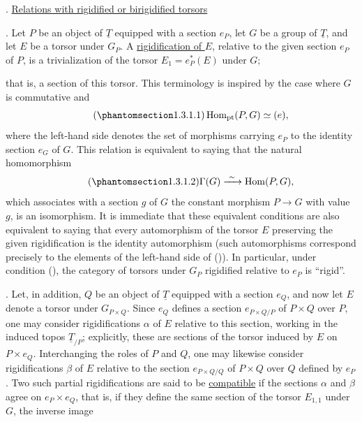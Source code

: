 
. \underline{Relations with rigidified or birigidified torsors}

. Let $P$ be an object of $\underline T$ equipped with a section
$e_P$, let $G$ be a group of $\underline T$, and let $E$ be a torsor
under $G_P$. A \underline{rigidification of $E$}, relative to the given
section $e_P$ of $P$, is a trivialization of the torsor
$E_1=e_P^*(E)$ under $G$;


that is, a section of this torsor. This terminology is inspired by the
case where $G$ is commutative and
\begin{equation}\tag{\SGARefTarget{sga7.sga7i.evii.n1-3-1-1}{1.3.1.1}}
 \operatorname{Hom}_{\mathrm{pt}}(P,G)\simeq(e),
\end{equation}
where the left-hand side denotes the set of morphisms carrying $e_P$ to
the identity section $e_G$ of $G$. This relation is equivalent to saying
that the natural homomorphism
\begin{equation}\tag{\SGARefTarget{sga7.sga7i.evii.n1-3-1-2}{1.3.1.2}}
 \Gamma(G)\xrightarrow{\ \sim\ }\operatorname{Hom}(P,G),
\end{equation}
which associates with a section $g$ of $G$ the constant morphism
$P\longrightarrow G$ with value $g$, is an isomorphism. It is immediate
that these equivalent conditions are also equivalent to saying that
every automorphism of the torsor $E$ preserving the given
rigidification is the identity automorphism (such automorphisms
correspond precisely to the elements of the left-hand side of
()). In particular, under condition (), the category of
torsors under $G_P$ rigidified relative to $e_P$ is ``rigid''.

. Let, in addition, $Q$ be an object of $\underline T$ equipped
with a section $e_Q$, and now let $E$ denote a torsor under
$G_{P\times Q}$. Since $e_Q$ defines a section
$e_{P\times Q/P}$ of $P\times Q$ over $P$, one may consider
rigidifications $\alpha$ of $E$ relative to this section, working in the
induced topos $\underline T_{/P}$; explicitly, these are sections of the
torsor induced by $E$ on $P\times e_Q$. Interchanging the roles of $P$
and $Q$, one may likewise consider rigidifications $\beta$ of $E$
relative to the section $e_{P\times Q/Q}$ of $P\times Q$ over $Q$
defined by $e_P$. Two such partial rigidifications are said to be
\underline{compatible} if the sections $\alpha$ and $\beta$ agree on
$e_P\times e_Q$, that is, if they define the same section of the torsor
$E_{1,1}$ under $G$, the inverse image



